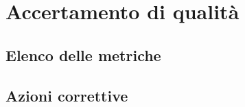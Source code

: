 \section{Accertamento di qualità}



\subsection{Elenco delle metriche}





\subsection{Azioni correttive}


